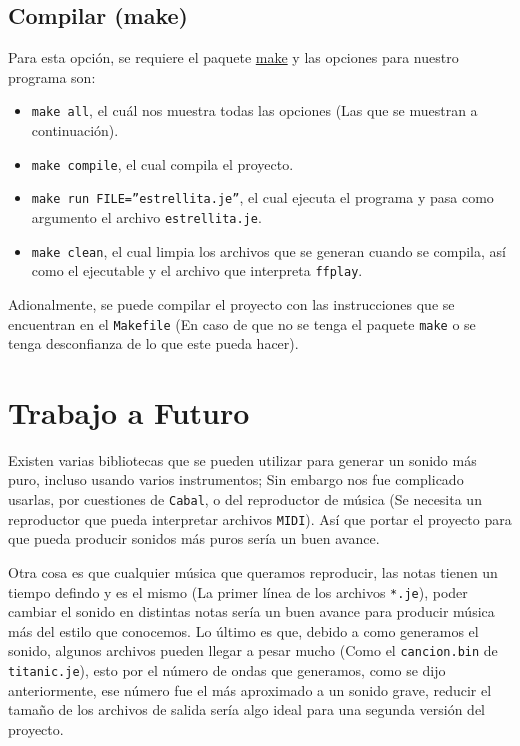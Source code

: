 \documentclass[10pt,a4paper]{article}
\begin{document}
\subsection{Compilar (make)}
Para esta opción, se requiere el paquete
\href{https://www.archlinux.org/packages/core/x86\_64/make/}{make} y las opciones
para nuestro programa son:

\begin{itemize}
\item \texttt{make all}, el cuál nos muestra todas las opciones (Las que se
  muestran a continuación).
\item \texttt{make compile}, el cual compila el proyecto.
\item \texttt{make run FILE=''estrellita.je''}, el cual ejecuta el programa y pasa
  como argumento el archivo \texttt{estrellita.je}.
\item \texttt{make clean}, el cual limpia los archivos que se generan cuando se
  compila, así como el ejecutable y el archivo que interpreta \texttt{ffplay}.
\end{itemize}

Adionalmente, se puede compilar el proyecto con las instrucciones que se
encuentran en el \texttt{Makefile} (En caso de que no se tenga el paquete
\texttt{make} o se tenga desconfianza de lo que este pueda hacer).

\section{Trabajo a Futuro}
\label{sec:TaF}
Existen varias bibliotecas\cite{paul} que se pueden utilizar para generar un
sonido más puro, incluso usando varios instrumentos; Sin embargo nos fue
complicado usarlas, por cuestiones de \texttt{Cabal}, o del reproductor de música
(Se necesita un reproductor que pueda interpretar archivos \texttt{MIDI}). Así
que portar el proyecto para que pueda producir sonidos más puros sería un buen
avance.

Otra cosa es que cualquier música que queramos reproducir, las notas tienen un
tiempo defindo y es el mismo (La primer línea de los archivos \texttt{*.je}),
poder cambiar el sonido en distintas notas sería un buen avance para producir
música más del estilo que conocemos. Lo último es que, debido a como generamos el sonido, algunos archivos pueden
llegar a pesar mucho (Como el \texttt{cancion.bin} de \texttt{titanic.je}), esto
por el número de ondas que generamos, como se dijo anteriormente, ese número fue
el más aproximado a un sonido grave, reducir el tamaño de los archivos de salida
sería algo ideal para una segunda versión del proyecto.
\end{document}
